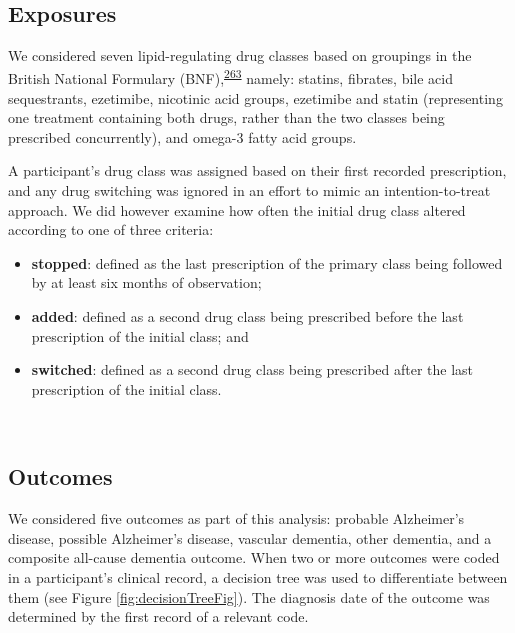 \documentclass[a4paper, twoside]{templates/ociamthesis}
\providecommand{\tightlist}{%
  \setlength{\itemsep}{0pt}\setlength{\parskip}{0pt}}
\begin{document}
~

\hypertarget{exposures}{%
\subsection{Exposures}\label{exposures}}

We considered seven lipid-regulating drug classes based on groupings in the British National Formulary (BNF),\textsuperscript{\protect\hyperlink{ref-wishart2017}{263}} namely: statins, fibrates, bile acid sequestrants, ezetimibe, nicotinic acid groups, ezetimibe and statin (representing one treatment containing both drugs, rather than the two classes being prescribed concurrently), and omega-3 fatty acid groups.

A participant's drug class was assigned based on their first recorded prescription, and any drug switching was ignored in an effort to mimic an intention-to-treat approach. We did however examine how often the initial drug class altered according to one of three criteria:

\begin{itemize}
\tightlist
\item
  \textbf{stopped}: defined as the last prescription of the primary class being followed by at least six months of observation;
\item
  \textbf{added}: defined as a second drug class being prescribed before the last prescription of the initial class; and
\item
  \textbf{switched}: defined as a second drug class being prescribed after the last prescription of the initial class.
\end{itemize}

~

\hypertarget{cprd-outcomes}{%
\subsection{Outcomes}\label{cprd-outcomes}}

We considered five outcomes as part of this analysis: probable Alzheimer's disease, possible Alzheimer's disease, vascular dementia, other dementia, and a composite all-cause dementia outcome. When two or more outcomes were coded in a participant's clinical record, a decision tree was used to differentiate between them (see Figure \ref{fig:decisionTreeFig}). The diagnosis date of the outcome was determined by the first record of a relevant code.
\end{document}
